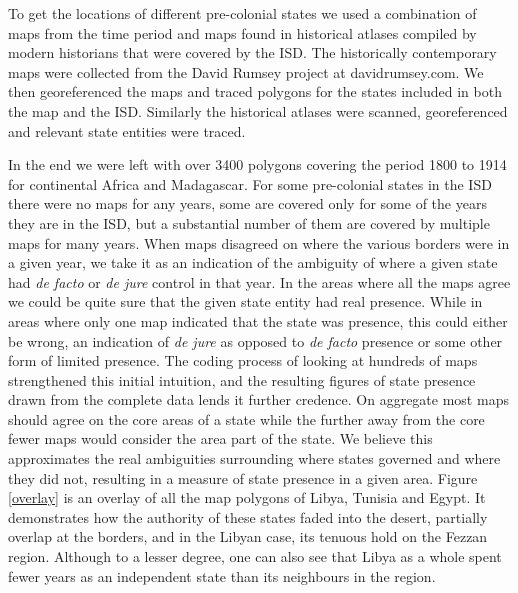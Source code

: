 \documentclass[12pt]{article}
\begin{document}
To get the locations of different pre-colonial states we used a combination of
maps from the time period and maps found in historical atlases compiled by
modern historians that were covered by the ISD. The historically contemporary
maps were collected from the David Rumsey project at davidrumsey.com. We then
georeferenced the maps and traced polygons for the states included in both the
map and the ISD. Similarly the historical atlases were scanned, georeferenced
and relevant state entities were traced.

In the end we were left with over 3400 polygons covering the period 1800 to 1914
for continental Africa and Madagascar. For some pre-colonial states in the ISD
there were no maps for any years, some are covered only for some of the years
they are in the ISD, but a substantial number of them are covered by multiple
maps for many years. When maps disagreed on where the various borders were in a
given year, we take it as an indication of the ambiguity of where a given state
had \emph{de facto} or \emph{de jure} control in that year. In the areas where
all the maps agree we could be quite sure that the given state entity had real
presence.  While in areas where only one map indicated that the state was
presence, this could either be wrong, an indication of \emph{de jure} as opposed
to \emph{de facto} presence or some other form of limited presence. The coding
process of looking at hundreds of maps strengthened this initial intuition, and
the resulting figures of state presence drawn from the complete data lends it
further credence. On aggregate most maps should agree on the core areas of a
state while the further away from the core fewer maps would consider the area
part of the state. We believe this approximates the real ambiguities surrounding
where states governed and where they did not, resulting in a measure of state
presence in a given area. Figure \ref{overlay} is an overlay of all the map
polygons of Libya, Tunisia and Egypt. It demonstrates how the authority of these
states faded into the desert, partially overlap at the borders, and in the
Libyan case, its tenuous hold on the Fezzan region. Although to a lesser degree,
one can also see that Libya as a whole spent fewer years as an independent state
than its neighbours in the region.
\end{document}
